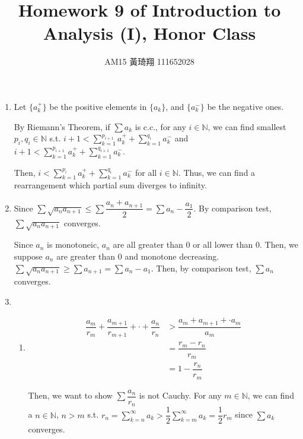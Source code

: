 \documentclass[12pt]{article}
\title{Homework 9 of Introduction to Analysis (I), Honor Class}
\author{AM15 黃琦翔 111652028}
\begin{document}
\maketitle
\begin{enumerate}
    \item Let $\lbrace a_k^+\rbrace$ be the positive elements in $\lbrace a_k\rbrace$, and $\lbrace a_k^-\rbrace$ be the negative ones.
    
    By Riemann's Theorem, if $\displaystyle\sum a_k$ is c.c., for any $i \in \mathbb{N}$,
    we can find smallest $p_i, q_i\in \mathbb{N}$ s.t. $i+1 < \displaystyle\sum_{k=1}^{p_{i+1}} a_k^+ + \displaystyle\sum_{k=1}^{q_i} a_k^-$
    and $i+1 < \displaystyle\sum_{k=1}^{p_{i+1}} a_k^+ + \displaystyle\sum_{k=1}^{q_{i+1}} a_k^-$.

    Then, $i < \displaystyle\sum_{k=1}^{p_i} a_k^+ + \displaystyle\sum_{k=1}^{q_i} a_k^-$ for all $i\in \mathbb{N}$.
    Thus, we can find a rearrangement which partial sum diverges to infinity.

    \item Since $\sum \sqrt{a_n a_{n+1}} \leq \sum \dfrac{a_n + a_{n+1}}{2} = \sum a_n - \dfrac{a_1}{2}$.
    By comparison test, $\sum \sqrt{a_n a_{n+1}}$ converges.

    Since $a_n$ is monotoneic, $a_n$ are all greater than $0$ or all lower than $0$.
    Then, we suppose $a_n$ are greater than $0$ and monotone decreasing.
    $\sum \sqrt{a_n a_{n+1}} \geq \sum a_{n+1} = \sum a_n - a_1$.
    Then, by comparison test, $\sum a_n$ converges.

    \item \begin{enumerate}
        \item \begin{align*}
            \dfrac{a_m}{r_m} + \dfrac{a_{m+1}}{r_{m+1}} + \cdot + \dfrac{a_n}{r_n} &> \dfrac{a_m + a_{m+1} + \cdot a_m}{a_m}\\
            &= \dfrac{r_m - r_n}{r_m}\\
            &= 1 - \dfrac{r_n}{r_m}
        \end{align*}

        \newpage
        Then, we want to show $\sum \dfrac{a_n}{r_n}$ is not Cauchy.
        For any $m \in \mathbb{N}$, we can find a $n \in \mathbb{N}$, $n > m$ s.t. 
        $r_n = \displaystyle\sum_{k=n}^{\infty} a_k > \dfrac{1}{2} \displaystyle\sum_{k=m}^{\infty} a_k = \dfrac{1}{2}r_m$
        since $\displaystyle\sum a_k$ converges.


\end{enumerate}
\end{enumerate}
\end{document}
